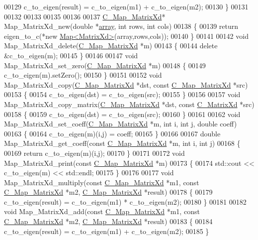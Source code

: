 \begin{DoxyCode}
00129   c\_to\_eigen(result) = c\_to\_eigen(m1) + c\_to\_eigen(m2);
00130 \}
00131 
00132 
00133 
00135 
00136 
00137 \hyperlink{struct_c___map___matrix_xd}{C\_Map\_MatrixXd}* Map\_MatrixXd\_new(\textcolor{keywordtype}{double} *\hyperlink{class_eigen_1_1array}{array}, \textcolor{keywordtype}{int} rows, \textcolor{keywordtype}{int} cols)
00138 \{
00139   \textcolor{keywordflow}{return} eigen\_to\_c(*\textcolor{keyword}{new} \hyperlink{group___core___module_class_eigen_1_1_map}{Map<MatrixXd>}(array,rows,cols));
00140 \}
00141 
00142 \textcolor{keywordtype}{void} Map\_MatrixXd\_delete(\hyperlink{struct_c___map___matrix_xd}{C\_Map\_MatrixXd} *m)
00143 \{
00144   \textcolor{keyword}{delete} &c\_to\_eigen(m);
00145 \}
00146 
00147 \textcolor{keywordtype}{void} Map\_MatrixXd\_set\_zero(\hyperlink{struct_c___map___matrix_xd}{C\_Map\_MatrixXd} *m)
00148 \{
00149   c\_to\_eigen(m).setZero();
00150 \}
00151 
00152 \textcolor{keywordtype}{void} Map\_MatrixXd\_copy(\hyperlink{struct_c___map___matrix_xd}{C\_Map\_MatrixXd} *dst, \textcolor{keyword}{const} \hyperlink{struct_c___map___matrix_xd}{C\_Map\_MatrixXd} *src)
00153 \{
00154   c\_to\_eigen(dst) = c\_to\_eigen(src);
00155 \}
00156 
00157 \textcolor{keywordtype}{void} Map\_MatrixXd\_copy\_matrix(\hyperlink{struct_c___map___matrix_xd}{C\_Map\_MatrixXd} *dst, \textcolor{keyword}{const} 
      \hyperlink{struct_c___matrix_xd}{C\_MatrixXd} *src)
00158 \{
00159   c\_to\_eigen(dst) = c\_to\_eigen(src);
00160 \}
00161 
00162 \textcolor{keywordtype}{void} Map\_MatrixXd\_set\_coeff(\hyperlink{struct_c___map___matrix_xd}{C\_Map\_MatrixXd} *m, \textcolor{keywordtype}{int} i, \textcolor{keywordtype}{int} j, \textcolor{keywordtype}{double} coeff)
00163 \{
00164   c\_to\_eigen(m)(i,j) = coeff;
00165 \}
00166 
00167 \textcolor{keywordtype}{double} Map\_MatrixXd\_get\_coeff(\textcolor{keyword}{const} \hyperlink{struct_c___map___matrix_xd}{C\_Map\_MatrixXd} *m, \textcolor{keywordtype}{int} i, \textcolor{keywordtype}{int} j)
00168 \{
00169   \textcolor{keywordflow}{return} c\_to\_eigen(m)(i,j);
00170 \}
00171 
00172 \textcolor{keywordtype}{void} Map\_MatrixXd\_print(\textcolor{keyword}{const} \hyperlink{struct_c___map___matrix_xd}{C\_Map\_MatrixXd} *m)
00173 \{
00174   std::cout << c\_to\_eigen(m) << std::endl;
00175 \}
00176 
00177 \textcolor{keywordtype}{void} Map\_MatrixXd\_multiply(\textcolor{keyword}{const} \hyperlink{struct_c___map___matrix_xd}{C\_Map\_MatrixXd} *m1, \textcolor{keyword}{const} 
      \hyperlink{struct_c___map___matrix_xd}{C\_Map\_MatrixXd} *m2, \hyperlink{struct_c___map___matrix_xd}{C\_Map\_MatrixXd} *result)
00178 \{
00179   c\_to\_eigen(result) = c\_to\_eigen(m1) * c\_to\_eigen(m2);
00180 \}
00181 
00182 \textcolor{keywordtype}{void} Map\_MatrixXd\_add(\textcolor{keyword}{const} \hyperlink{struct_c___map___matrix_xd}{C\_Map\_MatrixXd} *m1, \textcolor{keyword}{const} 
      \hyperlink{struct_c___map___matrix_xd}{C\_Map\_MatrixXd} *m2, \hyperlink{struct_c___map___matrix_xd}{C\_Map\_MatrixXd} *result)
00183 \{
00184   c\_to\_eigen(result) = c\_to\_eigen(m1) + c\_to\_eigen(m2);
00185 \}
\end{DoxyCode}
